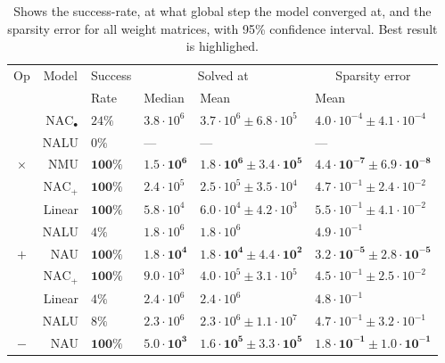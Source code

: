 \begin{table}[!h]

\caption{\label{tab:function-task-static-defaults}Shows the success-rate, at what global step the model converged at, and the sparsity error for all weight matrices, with 95\% confidence interval. Best result is highlighed.}
\centering
\begin{tabular}{crllll}
\toprule
\multicolumn{1}{c}{Op} & \multicolumn{1}{c}{Model} & \multicolumn{1}{c}{Success} & \multicolumn{2}{c}{Solved at} & \multicolumn{1}{c}{Sparsity error} \\
\cmidrule(l{3pt}r{3pt}){1-1} \cmidrule(l{3pt}r{3pt}){2-2} \cmidrule(l{3pt}r{3pt}){3-3} \cmidrule(l{3pt}r{3pt}){4-5} \cmidrule(l{3pt}r{3pt}){6-6}
 &  & Rate & Median & Mean & Mean\\
\midrule
 & $\mathrm{NAC}_{\bullet}$ & $24\%$ & $3.8 \cdot 10^{6}$ & $3.7 \cdot 10^{6} \pm 6.8 \cdot 10^{5}$ & $4.0 \cdot 10^{-4} \pm 4.1 \cdot 10^{-4}$\\

 & NALU & $0\%$ & --- & --- & ---\\

\multirow{-3}{*}{\centering\arraybackslash $\bm{\times}$} & NMU & $\mathbf{100\%}$ & $\mathbf{1.5 \cdot 10^{6}}$ & $\mathbf{1.8 \cdot 10^{6} \pm 3.4 \cdot 10^{5}}$ & $\mathbf{4.4 \cdot 10^{-7} \pm 6.9 \cdot 10^{-8}}$\\
\cmidrule{1-6}
 & $\mathrm{NAC}_{+}$ & $\mathbf{100\%}$ & $2.4 \cdot 10^{5}$ & $2.5 \cdot 10^{5} \pm 3.5 \cdot 10^{4}$ & $4.7 \cdot 10^{-1} \pm 2.4 \cdot 10^{-2}$\\

 & Linear & $\mathbf{100\%}$ & $5.8 \cdot 10^{4}$ & $6.0 \cdot 10^{4} \pm 4.2 \cdot 10^{3}$ & $5.5 \cdot 10^{-1} \pm 4.1 \cdot 10^{-2}$\\

 & NALU & $4\%$ & $1.8 \cdot 10^{6}$ & $1.8 \cdot 10^{6}$ & $4.9 \cdot 10^{-1}$\\

\multirow{-4}{*}{\centering\arraybackslash $\bm{+}$} & NAU & $\mathbf{100\%}$ & $\mathbf{1.8 \cdot 10^{4}}$ & $\mathbf{1.8 \cdot 10^{4} \pm 4.4 \cdot 10^{2}}$ & $\mathbf{3.2 \cdot 10^{-5} \pm 2.8 \cdot 10^{-5}}$\\
\cmidrule{1-6}
 & $\mathrm{NAC}_{+}$ & $\mathbf{100\%}$ & $9.0 \cdot 10^{3}$ & $4.0 \cdot 10^{5} \pm 3.1 \cdot 10^{5}$ & $4.5 \cdot 10^{-1} \pm 2.5 \cdot 10^{-2}$\\

 & Linear & $4\%$ & $2.4 \cdot 10^{6}$ & $2.4 \cdot 10^{6}$ & $4.8 \cdot 10^{-1}$\\

 & NALU & $8\%$ & $2.3 \cdot 10^{6}$ & $2.3 \cdot 10^{6} \pm 1.1 \cdot 10^{7}$ & $4.7 \cdot 10^{-1} \pm 3.2 \cdot 10^{-1}$\\

\multirow{-4}{*}{\centering\arraybackslash $\bm{-}$} & NAU & $\mathbf{100\%}$ & $\mathbf{5.0 \cdot 10^{3}}$ & $\mathbf{1.6 \cdot 10^{5} \pm 3.3 \cdot 10^{5}}$ & $\mathbf{1.8 \cdot 10^{-1} \pm 1.0 \cdot 10^{-1}}$\\
\bottomrule
\end{tabular}
\end{table}
